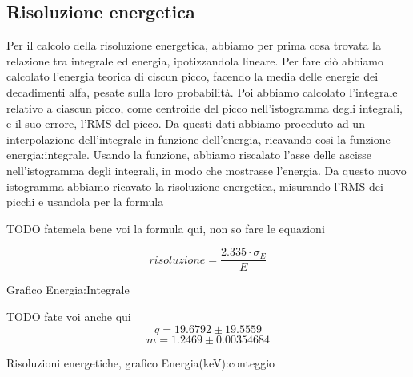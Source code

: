 \subsection{Risoluzione energetica}
\FloatBarrier
Per il calcolo della risoluzione energetica, abbiamo per prima cosa trovata la relazione tra integrale ed energia, ipotizzandola lineare. 
Per fare ciò abbiamo calcolato l'energia teorica di ciscun picco, facendo la media delle energie dei decadimenti alfa, pesate sulla loro probabilità. 
Poi abbiamo calcolato l'integrale relativo a ciascun picco, come centroide del picco nell'istogramma degli integrali, e il suo errore, l'RMS del picco.
Da questi dati abbiamo proceduto ad un interpolazione dell'integrale in funzione dell'energia, ricavando così la funzione energia:integrale. 
Usando la funzione, abbiamo riscalato l'asse delle ascisse nell'istogramma degli integrali, in modo che mostrasse l'energia. 
Da questo nuovo istogramma abbiamo ricavato la risoluzione energetica, misurando l'RMS dei picchi e usandola per la formula

TODO fatemela bene voi la formula qui, non so fare le equazioni

$$risoluzione=\frac{2.335\cdot\sigma_E}{E}$$

\begin{grafico}
 \centering
 \resizebox{\textwidth}{!}{%
 
 }%
 \caption{Grafico Energia:Integrale} 
 \label{gr:energy_integral.tex} 
\end{grafico}

TODO fate voi anche qui
$$q=19.6792\pm19.5559$$
$$m=1.2469\pm0.00354684$$

\begin{grafico}
 \centering
 \caption{Risoluzioni energetiche, grafico Energia(keV):conteggio} 
 \label{gr:600_energy.tex} 
\end{grafico}

\FloatBarrier
